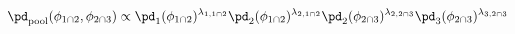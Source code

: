 \begin{equation}
  \pd_{\text{pool}} (\phi_{1 \cap 2}, \phi_{2 \cap 3}) \propto
  \pd_{1}(\phi_{1 \cap 2})^{\lambda_{1, 1 \cap 2}}
  \pd_{2}(\phi_{1 \cap 2})^{\lambda_{2, 1 \cap 2}}
  \pd_{2}(\phi_{2 \cap 3})^{\lambda_{2, 2 \cap 3}}
  \pd_{3}(\phi_{2 \cap 3})^{\lambda_{3, 2 \cap 3}}
  \label{eqn:pooling-via-marginalised-marginals}
\end{equation}